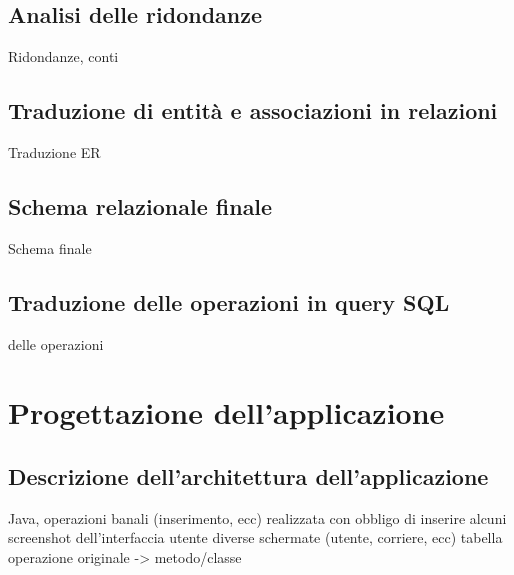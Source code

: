 \documentclass{report}
\begin{document}
\section{Analisi delle ridondanze}
Ridondanze, conti
\section{Traduzione di entità e associazioni in relazioni}
Traduzione ER
\section{Schema relazionale finale}
Schema finale
\section{Traduzione delle operazioni in query SQL}
delle operazioni

\chapter{Progettazione dell'applicazione}
\section{Descrizione dell'architettura dell'applicazione}
Java, operazioni banali (inserimento, ecc)
realizzata con obbligo di inserire alcuni screenshot dell'interfaccia utente
diverse schermate (utente, corriere, ecc)
tabella operazione originale -> metodo/classe
\end{document}
